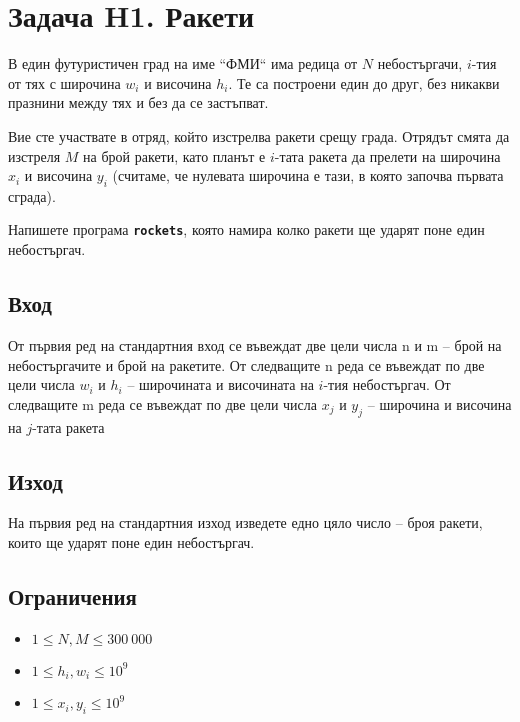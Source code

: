 \documentclass[12pt]{article}
\begin{document}
\section{Задача H1. Ракети}
В един футуристичен град на име ``ФМИ`` има редица от $N$ небостъргачи, $i$-тия от тях с широчина $w_i$ и височина $h_i$. Те са построени един до друг, без никакви празнини между тях и без да се застъпват.

Вие сте участвате в отряд, който изстрелва ракети срещу града. Отрядът смята да изстреля $M$ на брой ракети, като планът е $i$-тата ракета да прелети на широчина $x_i$ и височина $y_i$ (считаме, че нулевата широчина е тази, в която започва първата сграда).

Напишете програма \textbf{\texttt{rockets}}, която намира колко ракети ще ударят поне един небостъргач.
\subsection{Вход}
От първия ред на стандартния вход се въвеждат две цели числа n и m – брой на небостъргачите и брой на ракетите. От следващите n реда се въвеждат по две цели числа $w_i$ и $h_i$ – широчината и височината на $i$-тия небостъргач. От следващите m реда се въвеждат по две цели числа $x_j$ и $y_j$ – широчина и височина на $j$-тата ракета

\subsection{Изход}
На първия ред на стандартния изход изведете едно цяло число – броя ракети, които ще ударят поне един небостъргач.

\subsection{Ограничения}
\begin{itemize}
	\item $1\leq N, M \leq 300\ 000$
    \item $1\leq h_i, w_i \leq 10^9$
    \item $1\leq x_i, y_i \leq 10^9$
\end{itemize}
\end{document}
